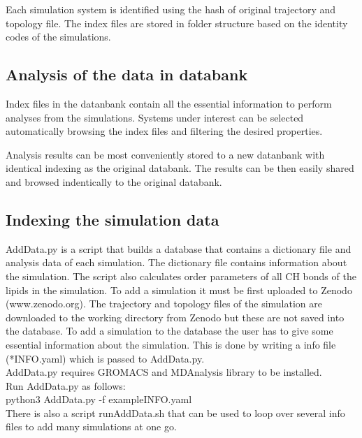 \documentclass[fleqn,10pt]{wlscirep}
\begin{document}
Each simulation system is identified using the hash of original trajectory and topology file. The index files are stored in folder structure based on the identity codes of the simulations.

\subsection{Analysis of the data in databank}

Index files in the datanbank contain all the essential information to perform analyses from the simulations. Systems under interest can be selected automatically browsing the index files and filtering the desired properties. 

Analysis results can be most conveniently stored to a new datanbank with identical indexing as the original databank. The results can be then easily shared and browsed indentically to the original databank.

\subsection{Indexing the simulation data}

AddData.py is a script that builds a database that contains a dictionary file and analysis data of each simulation. The dictionary file contains information about the simulation. The script also calculates order parameters of all CH bonds of the lipids in the simulation. To add a simulation it must be first uploaded to Zenodo (www.zenodo.org). The trajectory and topology files of the simulation are downloaded to the working directory from Zenodo but these are not saved into the database. To add a simulation to the database the user has to give some essential information about the simulation. This is done by writing a info file (*INFO.yaml) which is passed to AddData.py. 
\newline \\
AddData.py requires GROMACS and MDAnalysis library to be installed.
\newline \\
Run AddData.py as follows:
\newline \\
python3 AddData.py -f exampleINFO.yaml
\newline \\
There is also a script runAddData.sh that can be used to loop over several info files to add many simulations at one go.
\end{document}

